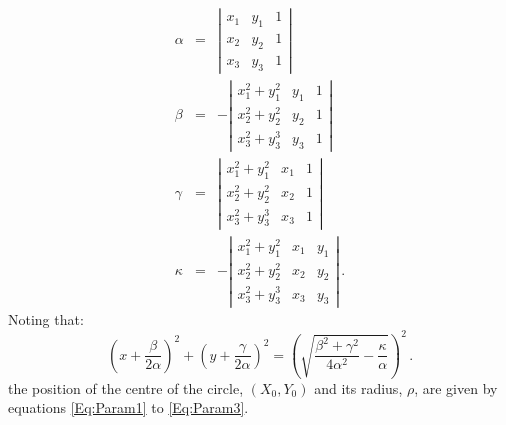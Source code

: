 \begin{eqnarray}
  \alpha & = & \left|
                 \begin{matrix}
                   x_1 & y_1 & 1\\
                   x_2 & y_2 & 1\\
                   x_3 & y_3 & 1
                 \end{matrix}
               \right|                                    \\
  \beta  & = & -\left|
                 \begin{matrix}
                   x_1^2+y_1^2 & y_1 & 1\\
                   x_2^2+y_2^2 & y_2 & 1\\
                   x_3^2+y_3^3 & y_3  & 1
                 \end{matrix}
               \right|                                    \\
  \gamma & = & \left|
                 \begin{matrix}
                   x_1^2+y_1^2 & x_1 & 1\\
                   x_2^2+y_2^2 & x_2 & 1\\
                   x_3^2+y_3^3 & x_3 & 1
                 \end{matrix}
               \right|                                   \\
  \kappa & = & -\left|
                 \begin{matrix}
                   x_1^2+y_1^2 & x_1 & y_1 \\
                   x_2^2+y_2^2 & x_2 & y_2 \\
                   x_3^2+y_3^3 & x_3 & y_3
                 \end{matrix}
               \right| \, .
\end{eqnarray}
Noting that:
\begin{equation}
  (x + \frac{\beta}{2 \alpha})^2  +
  (y + \frac{\gamma}{2 \alpha})^2 =
  \left( \sqrt{\frac{\beta^2 + \gamma^2}{4 \alpha^2} -
         \frac{\kappa}{\alpha} } 
  \right)^2 \, .
\end{equation}
the position of the centre of the circle, $(X_0, Y_0)$ and its radius,
$\rho$, are given by equations \ref{Eq:Param1} to \ref{Eq:Param3}.
